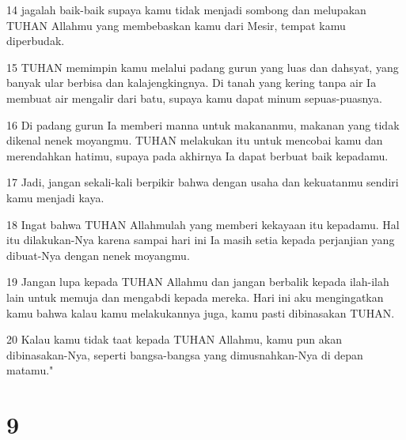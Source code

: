 \par 14 jagalah baik-baik supaya kamu tidak menjadi sombong dan melupakan TUHAN Allahmu yang membebaskan kamu dari Mesir, tempat kamu diperbudak.
\par 15 TUHAN memimpin kamu melalui padang gurun yang luas dan dahsyat, yang banyak ular berbisa dan kalajengkingnya. Di tanah yang kering tanpa air Ia membuat air mengalir dari batu, supaya kamu dapat minum sepuas-puasnya.
\par 16 Di padang gurun Ia memberi manna untuk makananmu, makanan yang tidak dikenal nenek moyangmu. TUHAN melakukan itu untuk mencobai kamu dan merendahkan hatimu, supaya pada akhirnya Ia dapat berbuat baik kepadamu.
\par 17 Jadi, jangan sekali-kali berpikir bahwa dengan usaha dan kekuatanmu sendiri kamu menjadi kaya.
\par 18 Ingat bahwa TUHAN Allahmulah yang memberi kekayaan itu kepadamu. Hal itu dilakukan-Nya karena sampai hari ini Ia masih setia kepada perjanjian yang dibuat-Nya dengan nenek moyangmu.
\par 19 Jangan lupa kepada TUHAN Allahmu dan jangan berbalik kepada ilah-ilah lain untuk memuja dan mengabdi kepada mereka. Hari ini aku mengingatkan kamu bahwa kalau kamu melakukannya juga, kamu pasti dibinasakan TUHAN.
\par 20 Kalau kamu tidak taat kepada TUHAN Allahmu, kamu pun akan dibinasakan-Nya, seperti bangsa-bangsa yang dimusnahkan-Nya di depan matamu."

\chapter{9}

